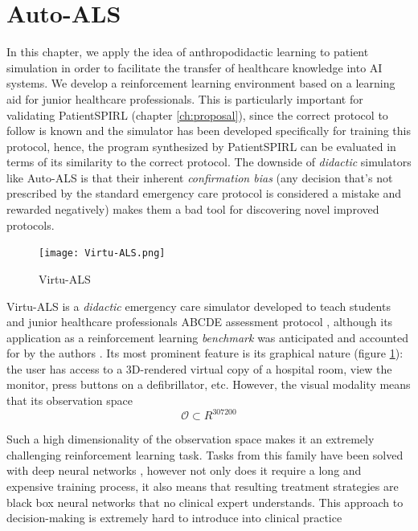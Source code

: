 \newpage
\section{Auto-ALS}
\label{sec:auto-als}


In this chapter, we apply the idea of anthropodidactic learning to patient simulation in order to facilitate the transfer of healthcare knowledge into AI systems.
We develop a reinforcement learning environment based on a learning aid for junior healthcare professionals.
This is particularly important for validating PatientSPIRL (chapter \ref{ch:proposal}), since the correct protocol to follow is known and the simulator has been developed specifically for training this protocol, hence, the program synthesized by PatientSPIRL can be evaluated in terms of its similarity to the correct protocol.
The downside of \emph{didactic} simulators like Auto-ALS is that their inherent \emph{confirmation bias} (any decision that's not prescribed by the standard emergency care protocol is considered a mistake and rewarded negatively) makes them a bad tool for discovering novel improved protocols.

\begin{figure}
    \centering
    \texttt{[image: Virtu-ALS.png]}
    \caption{Virtu-ALS}
    \label{fig:virtu-als}
\end{figure}

Virtu-ALS is a \emph{didactic} emergency care simulator developed to teach students and junior healthcare professionals ABCDE assessment protocol \cite{thimInitialAssessmentTreatment2012}, although its application as a reinforcement learning \emph{benchmark} was anticipated and accounted for by the authors \cite{briskAIEnhanceInteractive2018}.
Its most prominent feature is its graphical nature (figure \ref{fig:virtu-als}): the user has access to a 3D-rendered virtual copy of a hospital room, view the monitor, press buttons on a defibrillator, etc.
However, the visual modality means that its observation space 
\begin{equation}
    \mathcal{O} \subset R^{307200}
\end{equation}

Such a high dimensionality of the observation space makes it an extremely challenging reinforcement learning task.
Tasks from this family have been solved with deep neural networks \cite{mnihPlayingAtariDeep2013}, however not only does it require a long and expensive training process, it also means that resulting treatment strategies are black box neural networks that no clinical expert understands.
This approach to decision-making is extremely hard to introduce into clinical practice \cite{priceBigDataBlackbox2018,watsonClinicalApplicationsMachine2019}

